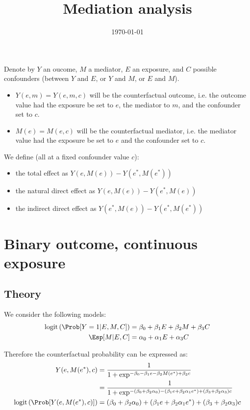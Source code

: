 \documentclass[12pt]{article}
\date{\today}
\title{Mediation analysis}
\begin{document}
\maketitle
Denote by \(Y\) an oucome, \(M\) a mediator, \(E\) an exposure, and
\(C\) possible confounders (between \(Y\) and \(E\), or \(Y\) and
\(M\), or \(E\) and \(M\)).
\begin{itemize}
\item \(Y(e,m)=Y(e,m,c)\) will be the counterfactual outcome, i.e. the outcome
value had the exposure be set to \(e\), the mediator to \(m\), and the confounder set to \(c\).
\item \(M(e)=M(e,c)\) will be the counterfactual mediator, i.e. the mediator
value had the exposure be set to \(e\) and the confounder set to \(c\).
\end{itemize}

\bigskip

We define (all at a fixed confounder value \(c\)):
\begin{itemize}
\item the total effect as \(Y(e,M(e))-Y(e^*,M(e^*))\)
\item the natural direct effect as \(Y(e,M(e))-Y(e^*,M(e))\)
\item the indirect direct effect as \(Y(e^*,M(e))-Y(e^*,M(e^*))\)
\end{itemize}

\section{Binary outcome, continuous exposure}
\label{sec:org6ee127e}
\subsection{Theory}
\label{sec:org6eb5d4d}
We consider the following models:
\begin{align*}
\text{logit}\left(\Prob[Y=1|E,M,C]\right) &= \beta_0 + \beta_1 E + \beta_2 M + \beta_3 C \\
\Esp[M|E,C] &= \alpha_0 + \alpha_1 E + \alpha_3 C
\end{align*}

Therefore the counterfactual probability can be expressed as:
\begin{align*}
Y(e,M(e^*),c) &= \frac{1}{1+\exp^{-\beta_0 - \beta_1 e - \beta_2 M(e^*) + \beta_3 c}} \\
              &= \frac{1}{1+\exp^{-(\beta_0+\beta_2 \alpha_0) - (\beta_1 e + \beta_2 \alpha_1 e^*) + (\beta_3 + \beta_2 \alpha_3) c}} \\
\text{logit}\left(\Prob[Y(e,M(e^*),c)]\right) &= (\beta_0+\beta_2 \alpha_0) + (\beta_1 e + \beta_2 \alpha_1 e^*) + (\beta_3 + \beta_2 \alpha_3) c
\end{align*}
\end{document}
